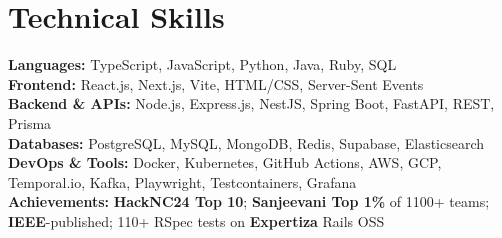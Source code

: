 \documentclass[9pt]{extarticle}
\begin{document}
\section{Technical Skills}
 \begin{itemize}[leftmargin=0.15in, label={}]
    \small{\item{
     \textbf{Languages:} TypeScript, JavaScript, Python, Java, Ruby, SQL \\ \vspace{1pt}
     \textbf{Frontend:} React.js, Next.js, Vite, HTML/CSS, Server-Sent Events \\ \vspace{1pt}
     \textbf{Backend \& APIs:} Node.js, Express.js, NestJS, Spring Boot, FastAPI, REST, Prisma \\ \vspace{1pt}
     \textbf{Databases:} PostgreSQL, MySQL, MongoDB, Redis, Supabase, Elasticsearch \\ \vspace{1pt}
     \textbf{DevOps \& Tools:} Docker, Kubernetes, GitHub Actions, AWS, GCP, Temporal.io, Kafka, Playwright, Testcontainers, Grafana \\ \vspace{1pt}
     \textbf{Achievements:} \textbf{HackNC24 Top 10}; \textbf{Sanjeevani Top 1\%} of 1100+ teams; \textbf{IEEE}-published; 110+ RSpec tests on \textbf{Expertiza} Rails OSS
    }}
 \end{itemize}

\end{document}
